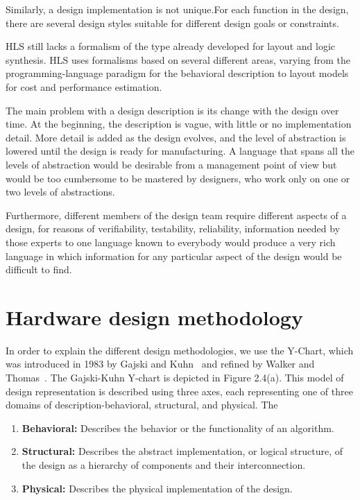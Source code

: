 Similarly, a design implementation is not unique.For each function in the design, there are several design styles suitable for different design goals or constraints.

HLS still lacks a formalism of the type already developed for layout and logic synthesis. HLS uses formalisms based on several different areas, varying from the programming-language paradigm for the behavioral description to layout models for cost and performance estimation.


The main problem with a design description is its change with the design over time. At the beginning, the description is vague, with little or no implementation detail. More detail is added as the design evolves, and the level of abstraction is lowered until the design is ready for manufacturing. A language that spans all the levels of abstraction would be desirable from a management point of view but would be too cumbersome to be mastered by designers, who work only on one or two levels of abstractions.

Furthermore, different members of the design team require different aspects of a design, for reasons of verifiability, testability, reliability, information needed by those experts to one language known to everybody would produce a very rich language in which information for any particular aspect of the design would be difficult to find.

\section{Hardware design methodology}

In order to explain the different design methodologies, we use the Y-Chart, which was introduced in 1983 by Gajski and Kuhn~\cite{gajski_1992_high} and refined by Walker and Thomas~\cite{walker_1985_y_model}.
The Gajski-Kuhn Y-chart is depicted in Figure 2.4(a). This model of design representation is described using three axes, each representing one of three domains of description-behavioral, structural, and physical. The

\begin{enumerate}
    \item \textbf{Behavioral: } Describes the behavior or the functionality of an algorithm.
    \item \textbf{Structural: } Describes the abstract implementation, or logical structure, of the design as a hierarchy of components and their interconnection.
    \item \textbf{Physical: }  Describes the physical implementation of the design.
\end{enumerate}
